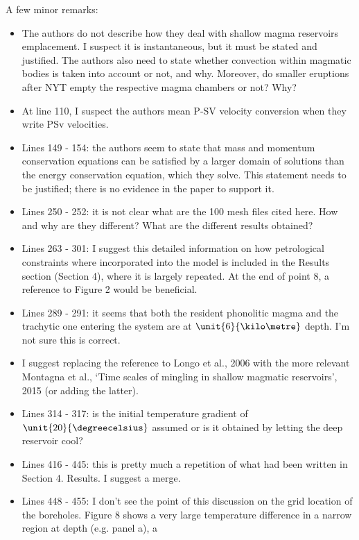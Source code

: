\documentclass[a4paper,notitlepage]{article}
\begin{document}
A few minor remarks:
\begin{itemize}
  \item The authors do not describe how they deal with shallow magma reservoirs
    emplacement. I suspect it is instantaneous, but it must be stated and
    justified. The authors also need to state whether convection within
    magmatic bodies is
    taken into account or not, and why. Moreover, do smaller eruptions after NYT
    empty the respective magma chambers or not? Why?
  \item At line 110, I suspect the authors mean P-SV velocity conversion when
    they write PSv velocities.
  \item Lines 149 - 154: the authors seem to state that mass and momentum
    conservation equations can be satisfied by a larger domain of solutions
    than the energy conservation equation, which they solve. This statement
    needs to be justified; there is no evidence in the paper to support it.
  \item Lines 250 - 252: it is not clear what are the 100 mesh files cited here.
    How and why are they different? What are the different results obtained?
  \item Lines 263 - 301: I suggest this detailed information on how petrological
    constraints where incorporated into the model is included in the Results
    section (Section 4), where it is largely repeated. At the end of point 8, a
    reference
    to Figure 2 would be beneficial.
  \item Lines 289 - 291: it seems that both the resident phonolitic magma and
    the trachytic one entering the system are at $\unit{6}{\kilo\metre}$ depth.
    I'm not sure this is correct.
  \item I suggest replacing the reference to Longo et al., 2006 with the more
    relevant Montagna
    et al.,
    \lq Time scales of mingling in shallow magmatic reservoirs\rq, 2015 (or
    adding the latter).
  \item Lines 314 - 317: is the initial temperature gradient of
    $\unit{20}{\degreecelsius}$ assumed or is it obtained by letting the deep
    reservoir cool?
  \item Lines 416 - 445: this is pretty much a repetition of what had been
    written in Section 4. Results. I suggest a merge.
  \item Lines 448 - 455: I don't see the point of this discussion on the grid
    location of the boreholes. Figure 8 shows a very large temperature
    difference in a narrow region at depth (e.g. panel a), a

\end{itemize}
\end{document}
